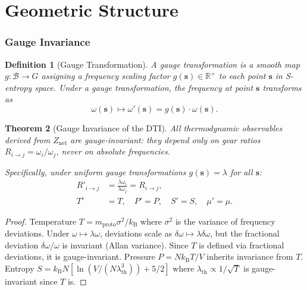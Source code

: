 \documentclass[twocolumn,10pt]{article}
\newtheorem{theorem}{Theorem}[section]
\newtheorem{definition}[theorem]{Definition}
\theoremstyle{remark}
\newcommand{\kB}{k_{\mathrm{B}}}
\newcommand{\mproto}{m_{\mathrm{proto}}}
\newcommand{\Znet}{Z_{\mathrm{net}}}
\begin{document}
\part{Geometric Structure}

\section{Gauge Invariance}
\label{sec:gauge}

\begin{definition}[Gauge Transformation]
\label{def:gauge}
A \emph{gauge transformation} is a smooth map $g : \mathcal{B} \to G$ assigning a frequency scaling factor $g(\mathbf{s}) \in \mathbb{R}^+$ to each point $\mathbf{s}$ in S-entropy space.  Under a gauge transformation, the frequency at point $\mathbf{s}$ transforms as
\begin{equation}
    \omega(\mathbf{s}) \mapsto \omega'(\mathbf{s}) = g(\mathbf{s}) \cdot \omega(\mathbf{s}).
    \label{eq:gauge_transform}
\end{equation}
\end{definition}

\begin{theorem}[Gauge Invariance of the DTI]
\label{thm:gauge_invariance}
All thermodynamic observables derived from $\Znet$ are gauge-invariant: they depend only on gear ratios $R_{i \to j} = \omega_i / \omega_j$, never on absolute frequencies.

Specifically, under uniform gauge transformations $g(\mathbf{s}) = \lambda$ for all $\mathbf{s}$:
\begin{align}
    R'_{i \to j} &= \frac{\lambda\omega_i}{\lambda\omega_j} = R_{i \to j}, \\
    T' &= T, \quad P' = P, \quad S' = S, \quad \mu' = \mu.
\end{align}
\end{theorem}

\begin{proof}
Temperature $T = \mproto\sigma^2/\kB$ where $\sigma^2$ is the variance of frequency deviations.  Under $\omega \mapsto \lambda\omega$, deviations scale as $\delta\omega \mapsto \lambda\delta\omega$, but the fractional deviation $\delta\omega/\omega$ is invariant (Allan variance).  Since $T$ is defined via fractional deviations, it is gauge-invariant.  Pressure $P = N\kB T/V$ inherits invariance from $T$.  Entropy $S = \kB N[\ln(V/(N\lambda_{\mathrm{th}}^3)) + 5/2]$ where $\lambda_{\mathrm{th}} \propto 1/\sqrt{T}$ is gauge-invariant since $T$ is.
\end{proof}
\end{document}
